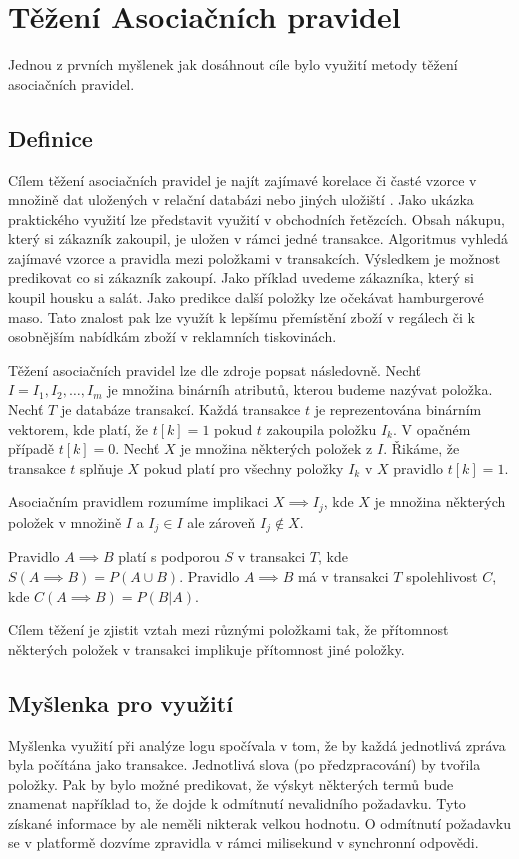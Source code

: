 \documentclass[thesis=M,czech]{FITthesis}[2012/10/20]
\begin{document}
		
		
		
	\section{Těžení Asociačních pravidel}
		Jednou z prvních myšlenek jak dosáhnout cíle bylo využití metody těžení asociačních pravidel. 
		
		\subsection{Definice}
		Cílem těžení asociačních pravidel je najít zajímavé korelace či časté vzorce v množině dat uložených v relační databázi nebo jiných uložiští \cite{assoc1}. Jako ukázka praktického využití lze představit využití v obchodních řetězcích. Obsah nákupu, který si zákazník zakoupil, je uložen v rámci jedné transakce. Algoritmus vyhledá zajímavé vzorce a pravidla mezi položkami v transakcích. Výsledkem je možnost predikovat co si zákazník zakoupí. Jako příklad uvedeme zákazníka, který si koupil housku a salát. Jako predikce další položky lze očekávat hamburgerové maso. Tato znalost pak lze využít k lepšímu přemístění zboží v regálech či k osobnějším nabídkám zboží v reklamních tiskovinách.
		
		Těžení asociačních pravidel lze dle zdroje \cite{AsocAgrawal1} popsat následovně. Nechť $I = I_1, I_2,\ldots,I_m$ je množina binárníh atributů, kterou budeme nazývat položka. Nechť $T$ je databáze transakcí. Každá transakce $t$ je reprezentována binárním vektorem, kde platí, že $t[k] = 1$ pokud $t$ zakoupila položku $I_k$. V opačném případě $t[k] = 0$. Nechť $X$  je množina některých položek z $I$. Řikáme, že transakce $t$ splňuje $X$ pokud platí pro všechny položky $I_k$ v $X$ pravidlo $t[k] = 1$.	
			
		Asociačním pravidlem rozumíme implikaci $X \implies I_j$, kde $X$ je množina některých položek v množině $I$ a $I_j \in I$ ale zároveň $I_j \notin X$.
		
		Pravidlo $A \implies B$ platí s podporou $S$ v transakci $T$, kde $S(A \implies B) = P(A \cup B)$. Pravidlo $A \implies B$ má v transakci $T$ spolehlivost $C$, kde $C(A \implies B) = P(B|A)$.
		
		Cílem těžení je zjistit vztah mezi různými položkami tak, že přítomnost některých položek v transakci implikuje přítomnost jiné položky.
		
		\subsection{Myšlenka pro využití}
		Myšlenka využití při analýze logu spočívala v tom, že by každá jednotlivá zpráva byla počítána jako transakce. Jednotlivá slova (po předzpracování) by tvořila položky. Pak by bylo možné predikovat, že výskyt některých termů bude znamenat například to, že dojde k odmítnutí nevalidního požadavku. Tyto získané informace by ale neměli nikterak velkou hodnotu. O odmítnutí požadavku se v platformě dozvíme zpravidla v rámci milisekund v synchronní odpovědi.
		
\end{document}
